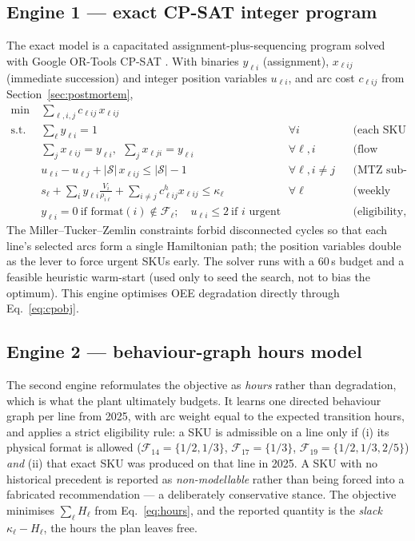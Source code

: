 \documentclass[11pt,a4paper]{article}
\begin{document}
\subsection{Engine 1 --- exact CP-SAT integer program}
The exact model is a capacitated assignment-plus-sequencing program solved with
Google OR-Tools CP-SAT \cite{perron2023ortools}. With binaries $y_{\ell i}$
(assignment), $x_{\ell ij}$ (immediate succession) and integer position variables
$u_{\ell i}$, and arc cost $c_{\ell ij}$ from Section~\ref{sec:postmortem},
\begin{align}
\min\ &\sum_{\ell,i,j} c_{\ell ij}\,x_{\ell ij} \label{eq:cpobj}\\[-1pt]
\text{s.t.}\ \ &\sum_{\ell} y_{\ell i}=1 &&\forall i &&\text{(each SKU produced once)}\\
&\sum_{j} x_{\ell ij}=y_{\ell i},\ \ \sum_{j} x_{\ell ji}=y_{\ell i} &&\forall \ell,i &&\text{(flow conservation, virtual start/end)}\\
&u_{\ell i}-u_{\ell j}+|\mathcal{S}|\,x_{\ell ij}\le |\mathcal{S}|-1 &&\forall \ell,i\neq j &&\text{(MTZ sub-tour elimination)}\\
&s_\ell+\sum_i y_{\ell i}\tfrac{V_i}{\rho_{i\ell}}+\sum_{i\neq j} c^{h}_{\ell ij}x_{\ell ij}\le \kappa_\ell &&\forall \ell &&\text{(weekly capacity)}\\
&y_{\ell i}=0\ \text{if format}(i)\notin \mathcal{F}_\ell;\quad u_{\ell i}\le 2\ \text{if $i$ urgent} && &&\text{(eligibility, urgencies)}
\end{align}
The Miller--Tucker--Zemlin constraints \cite{miller1960mtz} forbid disconnected
cycles so that each line's selected arcs form a single Hamiltonian path; the
position variables double as the lever to force urgent SKUs early. The solver runs
with a $60$\,s budget and a feasible heuristic warm-start (used only to seed the
search, not to bias the optimum). This engine optimises OEE degradation directly
through Eq.~\eqref{eq:cpobj}.

\subsection{Engine 2 --- behaviour-graph hours model}
The second engine reformulates the objective as \emph{hours} rather than
degradation, which is what the plant ultimately budgets. It learns one directed
behaviour graph per line from 2025, with arc weight equal to the expected
transition hours, and applies a strict eligibility rule: a SKU is admissible on a
line only if (i) its physical format is allowed
($\mathcal F_{14}=\{1/2,1/3\}$, $\mathcal F_{17}=\{1/3\}$,
$\mathcal F_{19}=\{1/2,1/3,2/5\}$) \emph{and} (ii) that exact SKU was produced on
that line in 2025. A SKU with no historical precedent is reported as
\emph{non-modellable} rather than being forced into a fabricated recommendation
--- a deliberately conservative stance. The objective minimises
$\sum_\ell H_\ell$ from Eq.~\eqref{eq:hours}, and the reported quantity is the
\emph{slack} $\kappa_\ell-H_\ell$, the hours the plan leaves free.
\end{document}
